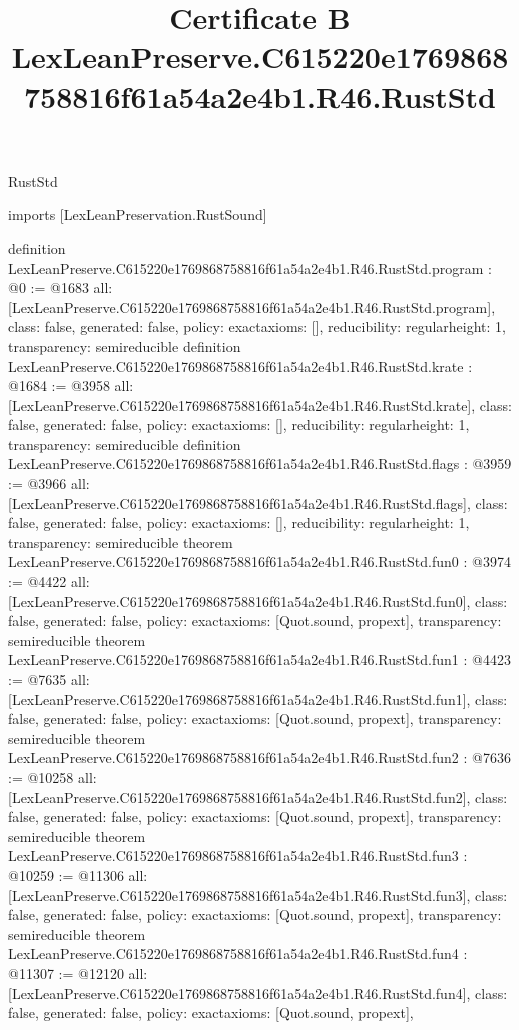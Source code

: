 \begin{lexlean}{RustStd}
\title{Certificate B LexLeanPreserve.C615220e1769868758816f61a54a2e4b1.R46.RustStd}
\begin{coremodule}
imports [LexLeanPreservation.RustSound]

definition LexLeanPreserve.C615220e1769868758816f61a54a2e4b1.R46.RustStd.program : @0 := @1683 {
  all: [LexLeanPreserve.C615220e1769868758816f61a54a2e4b1.R46.RustStd.program],
  class: false,
  generated: false,
  policy: exact{axioms: []},
  reducibility: regular{height: 1},
  transparency: semireducible
}
definition LexLeanPreserve.C615220e1769868758816f61a54a2e4b1.R46.RustStd.krate : @1684 := @3958 {
  all: [LexLeanPreserve.C615220e1769868758816f61a54a2e4b1.R46.RustStd.krate],
  class: false,
  generated: false,
  policy: exact{axioms: []},
  reducibility: regular{height: 1},
  transparency: semireducible
}
definition LexLeanPreserve.C615220e1769868758816f61a54a2e4b1.R46.RustStd.flags : @3959 := @3966 {
  all: [LexLeanPreserve.C615220e1769868758816f61a54a2e4b1.R46.RustStd.flags],
  class: false,
  generated: false,
  policy: exact{axioms: []},
  reducibility: regular{height: 1},
  transparency: semireducible
}
theorem LexLeanPreserve.C615220e1769868758816f61a54a2e4b1.R46.RustStd.fun0 : @3974 := @4422 {
  all: [LexLeanPreserve.C615220e1769868758816f61a54a2e4b1.R46.RustStd.fun0],
  class: false,
  generated: false,
  policy: exact{axioms: [Quot.sound, propext]},
  transparency: semireducible
}
theorem LexLeanPreserve.C615220e1769868758816f61a54a2e4b1.R46.RustStd.fun1 : @4423 := @7635 {
  all: [LexLeanPreserve.C615220e1769868758816f61a54a2e4b1.R46.RustStd.fun1],
  class: false,
  generated: false,
  policy: exact{axioms: [Quot.sound, propext]},
  transparency: semireducible
}
theorem LexLeanPreserve.C615220e1769868758816f61a54a2e4b1.R46.RustStd.fun2 : @7636 := @10258 {
  all: [LexLeanPreserve.C615220e1769868758816f61a54a2e4b1.R46.RustStd.fun2],
  class: false,
  generated: false,
  policy: exact{axioms: [Quot.sound, propext]},
  transparency: semireducible
}
theorem LexLeanPreserve.C615220e1769868758816f61a54a2e4b1.R46.RustStd.fun3 : @10259 := @11306 {
  all: [LexLeanPreserve.C615220e1769868758816f61a54a2e4b1.R46.RustStd.fun3],
  class: false,
  generated: false,
  policy: exact{axioms: [Quot.sound, propext]},
  transparency: semireducible
}
theorem LexLeanPreserve.C615220e1769868758816f61a54a2e4b1.R46.RustStd.fun4 : @11307 := @12120 {
  all: [LexLeanPreserve.C615220e1769868758816f61a54a2e4b1.R46.RustStd.fun4],
  class: false,
  generated: false,
  policy: exact{axioms: [Quot.sound, propext]},
}
\end{coremodule}
\end{lexlean}
